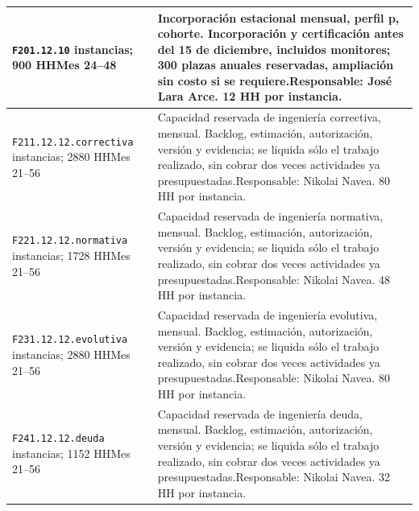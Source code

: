 \begin{longtable}{L{40mm}L{103mm}}
\texttt{F20}\newline \texttt{1.\allowbreak{}12.\allowbreak{}10} instancias; 900 HH\newline Mes 24--48 & Incorporación estacional mensual, perfil p, cohorte. Incorporación y certificación antes del 15 de diciembre, incluidos monitores; 300 plazas anuales reservadas, ampliación sin costo si se requiere.\newline Responsable: José Lara Arce. 12 HH por instancia.\\\hline
\texttt{F21}\newline \texttt{1.\allowbreak{}12.\allowbreak{}12.\allowbreak{}correctiva} instancias; 2880 HH\newline Mes 21--56 & Capacidad reservada de ingeniería correctiva, mensual. Backlog, estimación, autorización, versión y evidencia; se liquida sólo el trabajo realizado, sin cobrar dos veces actividades ya presupuestadas.\newline Responsable: Nikolai Navea. 80 HH por instancia.\\\hline
\texttt{F22}\newline \texttt{1.\allowbreak{}12.\allowbreak{}12.\allowbreak{}normativa} instancias; 1728 HH\newline Mes 21--56 & Capacidad reservada de ingeniería normativa, mensual. Backlog, estimación, autorización, versión y evidencia; se liquida sólo el trabajo realizado, sin cobrar dos veces actividades ya presupuestadas.\newline Responsable: Nikolai Navea. 48 HH por instancia.\\\hline
\texttt{F23}\newline \texttt{1.\allowbreak{}12.\allowbreak{}12.\allowbreak{}evolutiva} instancias; 2880 HH\newline Mes 21--56 & Capacidad reservada de ingeniería evolutiva, mensual. Backlog, estimación, autorización, versión y evidencia; se liquida sólo el trabajo realizado, sin cobrar dos veces actividades ya presupuestadas.\newline Responsable: Nikolai Navea. 80 HH por instancia.\\\hline
\texttt{F24}\newline \texttt{1.\allowbreak{}12.\allowbreak{}12.\allowbreak{}deuda} instancias; 1152 HH\newline Mes 21--56 & Capacidad reservada de ingeniería deuda, mensual. Backlog, estimación, autorización, versión y evidencia; se liquida sólo el trabajo realizado, sin cobrar dos veces actividades ya presupuestadas.\newline Responsable: Nikolai Navea. 32 HH por instancia.\\\hline

\end{longtable}
